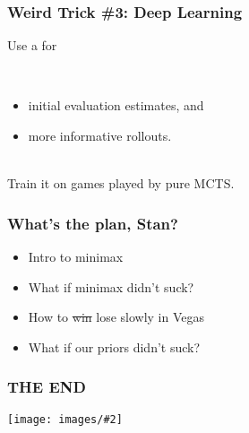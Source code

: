 \documentclass[table]{beamer}
\newcommand\img[2]{\texttt{[image: images/\#2]}}
\begin{document}
\begin{frame}
	\frametitle{Weird Trick \#3: Deep Learning}
	Use a \alert{}\footnotemark{} for
	
	\\[1.5ex]

	\begin{itemize}
		\setlength\itemsep{1.5ex}
		\item initial evaluation estimates, and
		\item more informative rollouts.
	\end{itemize}

	\\[1.5ex]

	Train it on games played by pure MCTS.

\end{frame}

\begin{frame}
	\frametitle{What's the plan, Stan?}
	\begin{itemize}
		\setlength\itemsep{5ex}
		\item Intro to minimax
		\item What if minimax didn't suck?
		\item How to \sout{win} lose slowly in Vegas
		\item What if our priors didn't suck?
	\end{itemize}
\end{frame}

\begin{frame}
	\frametitle{THE END}
	\begin{center}
		\img{0.8}{questions.jpg}
	\end{center}
\end{frame}
\end{document}
